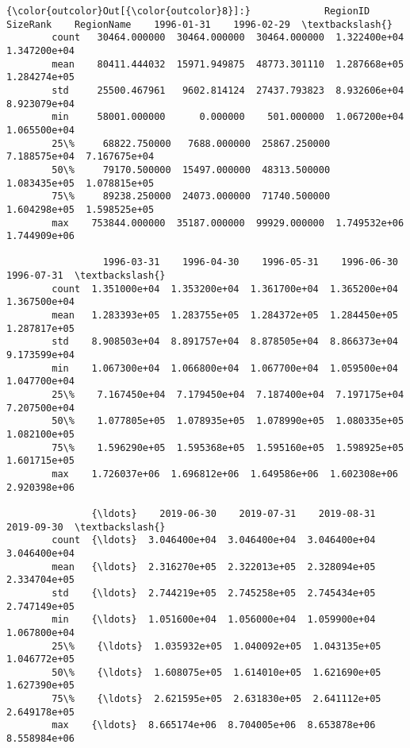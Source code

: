 \documentclass[11pt]{article}
\begin{document}
\begin{Verbatim}[commandchars=\\\{\}]
{\color{outcolor}Out[{\color{outcolor}8}]:}             RegionID      SizeRank    RegionName    1996-01-31    1996-02-29  \textbackslash{}
        count   30464.000000  30464.000000  30464.000000  1.322400e+04  1.347200e+04   
        mean    80411.444032  15971.949875  48773.301110  1.287668e+05  1.284274e+05   
        std     25500.467961   9602.814124  27437.793823  8.932606e+04  8.923079e+04   
        min     58001.000000      0.000000    501.000000  1.067200e+04  1.065500e+04   
        25\%     68822.750000   7688.000000  25867.250000  7.188575e+04  7.167675e+04   
        50\%     79170.500000  15497.000000  48313.500000  1.083435e+05  1.078815e+05   
        75\%     89238.250000  24073.000000  71740.500000  1.604298e+05  1.598525e+05   
        max    753844.000000  35187.000000  99929.000000  1.749532e+06  1.744909e+06   
        
                 1996-03-31    1996-04-30    1996-05-31    1996-06-30    1996-07-31  \textbackslash{}
        count  1.351000e+04  1.353200e+04  1.361700e+04  1.365200e+04  1.367500e+04   
        mean   1.283393e+05  1.283755e+05  1.284372e+05  1.284450e+05  1.287817e+05   
        std    8.908503e+04  8.891757e+04  8.878505e+04  8.866373e+04  9.173599e+04   
        min    1.067300e+04  1.066800e+04  1.067700e+04  1.059500e+04  1.047700e+04   
        25\%    7.167450e+04  7.179450e+04  7.187400e+04  7.197175e+04  7.207500e+04   
        50\%    1.077805e+05  1.078935e+05  1.078990e+05  1.080335e+05  1.082100e+05   
        75\%    1.596290e+05  1.595368e+05  1.595160e+05  1.598925e+05  1.601715e+05   
        max    1.726037e+06  1.696812e+06  1.649586e+06  1.602308e+06  2.920398e+06   
        
               {\ldots}    2019-06-30    2019-07-31    2019-08-31    2019-09-30  \textbackslash{}
        count  {\ldots}  3.046400e+04  3.046400e+04  3.046400e+04  3.046400e+04   
        mean   {\ldots}  2.316270e+05  2.322013e+05  2.328094e+05  2.334704e+05   
        std    {\ldots}  2.744219e+05  2.745258e+05  2.745434e+05  2.747149e+05   
        min    {\ldots}  1.051600e+04  1.056000e+04  1.059900e+04  1.067800e+04   
        25\%    {\ldots}  1.035932e+05  1.040092e+05  1.043135e+05  1.046772e+05   
        50\%    {\ldots}  1.608075e+05  1.614010e+05  1.621690e+05  1.627390e+05   
        75\%    {\ldots}  2.621595e+05  2.631830e+05  2.641112e+05  2.649178e+05   
        max    {\ldots}  8.665174e+06  8.704005e+06  8.653878e+06  8.558984e+06   
        

\end{Verbatim}
\end{document}

